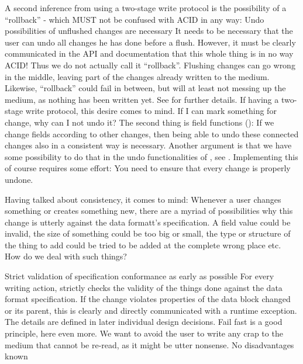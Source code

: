 A second inference from using a two-stage write protocol is the possibility of a ``rollback'' - which MUST not be confused with ACID in any way:
{%
Undo possibilities of unflushed changes are necessary
}
{%
It needs to be necessary that the user can undo all changes he has done before a flush. However, it must be clearly communicated in the API and documentation that this whole thing is in no way ACID! Thus we do not actually call it ``rollback''. Flushing changes can go wrong in the middle, leaving part of the changes already written to the medium. Likewise, ``rollback'' could fail in between, but will at least not messing up the medium, as nothing has been written yet. See  for further details.
}
{%
If having a two-stage write protocol, this desire comes to mind. If I can mark something for change, why can I not undo it? The second thing is field functions (): If we change fields according to other changes, then being able to undo these connected changes also in a consistent way is necessary. Another argument is that we have some possibility to do that in the undo functionalities of \COMPmedia{}, see .
}
{%
Implementing this of course requires some effort: You need to ensure that every change is properly undone.
}

Having talked about consistency, it comes to mind: Whenever a user changes something or creates something new, there are a myriad of possibilities why this change is utterly against the data formatt's specification. A field value could be invalid, the size of something could be too big or small, the type or structure of the thing to add could be tried to be added at the complete wrong place etc. How do we deal with such things?

{%
Strict validation of specification conformance as early as possible
}
{%
For every writing action, \COMPdataPartManagement{} strictly checks the validity of the things done against the data format specification. If the change violates properties of the data block changed or its parent, this is clearly and directly communicated with a runtime exception. The details are defined in later individual design decisions.
}
{%
Fail fast is a good principle, here even more. We want to avoid the user to write any crap to the medium that cannot be re-read, as it might be utter nonsense.
}
{%
No disadvantages known
}

